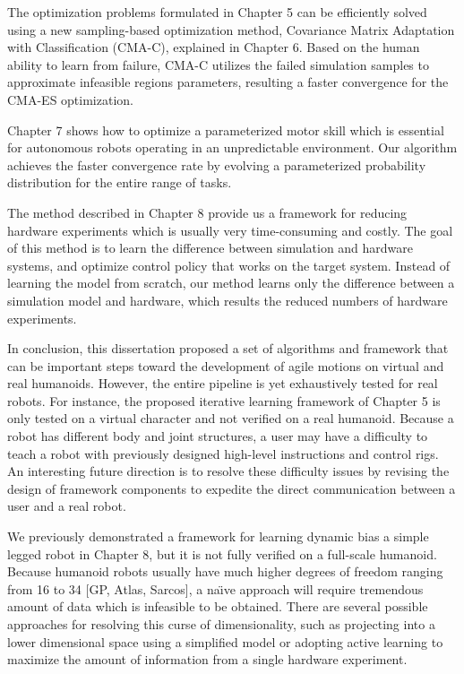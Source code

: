 The optimization problems formulated in Chapter 5 can be efficiently solved
using a new sampling-based optimization method, Covariance Matrix
Adaptation with Classification (CMA-C), explained in Chapter 6.
Based on the human ability to learn from failure,
CMA-C utilizes the failed simulation samples to approximate infeasible regions
parameters, resulting a faster convergence for the CMA-ES optimization.

Chapter 7 shows how to optimize a parameterized motor skill which
is essential for autonomous robots operating in an unpredictable environment.
Our algorithm achieves the faster convergence rate by evolving a parameterized
probability distribution for the entire range of tasks.

The method described in Chapter 8 provide us a framework for reducing hardware
experiments which is usually very time-consuming and costly.
The goal of this method is to learn the difference between simulation and
hardware systems, and optimize control policy that works on the target system.
Instead of learning the model from scratch, our method learns only the
difference between a simulation model and hardware, which results the reduced
numbers of hardware experiments.

In conclusion, this dissertation proposed a set of algorithms and framework
that can be important steps toward the development of agile motions on virtual
and real humanoids.
However, the entire pipeline is yet exhaustively tested for real robots.
For instance, the proposed iterative learning framework of Chapter 5 is only
tested on a virtual character and not verified on a real humanoid.
Because a robot has different body and joint structures,
a user may have a difficulty to teach a robot with previously
designed high-level instructions and control rigs.
An interesting future direction is to resolve these difficulty issues by 
revising the design of framework components to expedite the direct 
communication between a user and a real robot.

We previously demonstrated a framework for learning dynamic bias
a simple legged robot in Chapter 8, but it is not fully verified on a
full-scale humanoid.
Because humanoid robots usually have much higher degrees of freedom ranging
from 16 to 34 [GP, Atlas, Sarcos], a na\"{\i}ve approach will require
tremendous amount of data which is infeasible to be obtained.
There are several possible approaches for resolving this curse of
dimensionality, such as projecting into a lower dimensional space using a
simplified model or adopting active learning to maximize the amount of
information from a single hardware experiment.












